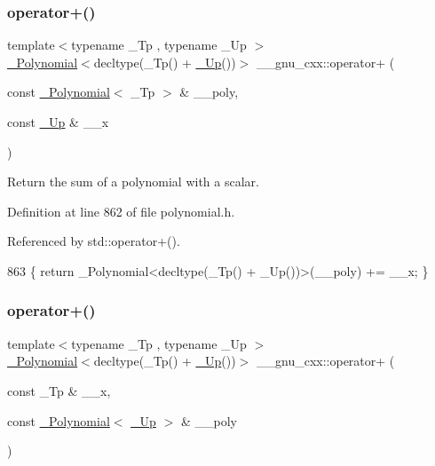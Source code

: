 \subsubsection{\texorpdfstring{operator+()}{operator+()}\hspace{0.1cm}{\footnotesize\ttfamily [4/6]}}
{\footnotesize\ttfamily template$<$typename \+\_\+\+Tp , typename \+\_\+\+Up $>$ \\
\hyperlink{class____gnu__cxx_1_1__Polynomial}{\+\_\+\+Polynomial}$<$decltype(\+\_\+\+Tp() + \hyperlink{namespace____gnu__cxx_ab693ea357b6429b331e0bf09f9442385}{\+\_\+\+Up}())$>$ \+\_\+\+\_\+gnu\+\_\+cxx\+::operator+ (\begin{DoxyParamCaption}\item[{const \hyperlink{class____gnu__cxx_1_1__Polynomial}{\+\_\+\+Polynomial}$<$ \+\_\+\+Tp $>$ \&}]{\+\_\+\+\_\+poly,  }\item[{const \hyperlink{namespace____gnu__cxx_ab693ea357b6429b331e0bf09f9442385}{\+\_\+\+Up} \&}]{\+\_\+\+\_\+x }\end{DoxyParamCaption})\hspace{0.3cm}{\ttfamily [inline]}}

Return the sum of a polynomial with a scalar. 

Definition at line 862 of file polynomial.\+h.



Referenced by std\+::operator+().


\begin{DoxyCode}
863     \{ \textcolor{keywordflow}{return} \_Polynomial<decltype(\_Tp() + \_Up())>(\_\_poly) += \_\_x; \}
\end{DoxyCode}
\mbox{\label{namespace____gnu__cxx_ac9f58ced995b65628b5715c885569cb7}} 
\subsubsection{\texorpdfstring{operator+()}{operator+()}\hspace{0.1cm}{\footnotesize\ttfamily [5/6]}}
{\footnotesize\ttfamily template$<$typename \+\_\+\+Tp , typename \+\_\+\+Up $>$ \\
\hyperlink{class____gnu__cxx_1_1__Polynomial}{\+\_\+\+Polynomial}$<$decltype(\+\_\+\+Tp() + \hyperlink{namespace____gnu__cxx_ab693ea357b6429b331e0bf09f9442385}{\+\_\+\+Up}())$>$ \+\_\+\+\_\+gnu\+\_\+cxx\+::operator+ (\begin{DoxyParamCaption}\item[{const \+\_\+\+Tp \&}]{\+\_\+\+\_\+x,  }\item[{const \hyperlink{class____gnu__cxx_1_1__Polynomial}{\+\_\+\+Polynomial}$<$ \hyperlink{namespace____gnu__cxx_ab693ea357b6429b331e0bf09f9442385}{\+\_\+\+Up} $>$ \&}]{\+\_\+\+\_\+poly }\end{DoxyParamCaption})\hspace{0.3cm}{\ttfamily [inline]}}




